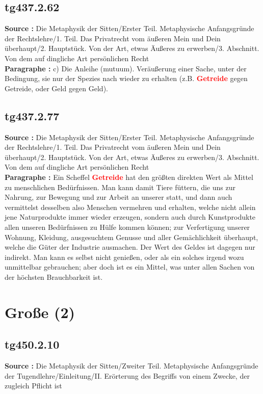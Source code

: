 \documentclass[a4paper,12pt,twoside]{book}
\newcommand{\match}[1]{\textcolor{red}{\textbf{#1}}}
\newcommand{\unnumberedsection}[1]{
	\section*{#1}
	\addcontentsline{toc}{section}{#1}
	\markright{#1}
}
\begin{document}
	\subsection*{tg437.2.62} 
	\textbf{Source : }Die Metaphysik der Sitten/Erster Teil. Metaphysische Anfangsgründe der Rechtslehre/1. Teil. Das Privatrecht vom äußeren Mein und Dein überhaupt/2. Hauptstück. Von der Art, etwas Äußeres zu erwerben/3. Abschnitt. Von dem auf dingliche Art persönlichen Recht\\  
	
	\textbf{Paragraphe : }c) Die Anleihe (mutuum). Veräußerung einer Sache, unter der Bedingung, sie nur der Spezies nach wieder zu erhalten (z.B. \match{Getreide} gegen Getreide, oder Geld gegen Geld). 
	
	\subsection*{tg437.2.77} 
	\textbf{Source : }Die Metaphysik der Sitten/Erster Teil. Metaphysische Anfangsgründe der Rechtslehre/1. Teil. Das Privatrecht vom äußeren Mein und Dein überhaupt/2. Hauptstück. Von der Art, etwas Äußeres zu erwerben/3. Abschnitt. Von dem auf dingliche Art persönlichen Recht\\  
	
	\textbf{Paragraphe : }Ein Scheffel \match{Getreide} hat den größten direkten Wert als Mittel zu menschlichen Bedürfnissen. Man kann damit Tiere füttern, die uns zur Nahrung, zur Bewegung und zur Arbeit an unserer statt, und dann auch vermittelst desselben also Menschen vermehren und erhalten, welche nicht allein jene Naturprodukte immer wieder erzeugen, sondern auch durch Kunstprodukte allen unseren Bedürfnissen zu Hülfe kommen können; zur Verfertigung unserer Wohnung, Kleidung, ausgesuchtem Genusse und aller Gemächlichkeit überhaupt, welche die Güter der Industrie ausmachen. Der Wert des Geldes ist dagegen nur indirekt. Man kann es selbst nicht genießen, oder als ein solches irgend wozu unmittelbar gebrauchen; aber doch ist es ein Mittel, was unter allen Sachen von der höchsten Brauchbarkeit ist. 
	
	\unnumberedsection{Große (2)} 
	\subsection*{tg450.2.10} 
	\textbf{Source : }Die Metaphysik der Sitten/Zweiter Teil. Metaphysische Anfangsgründe der Tugendlehre/Einleitung/II. Erörterung des Begriffs von einem Zwecke, der zugleich Pflicht ist\\  
	
\end{document}
